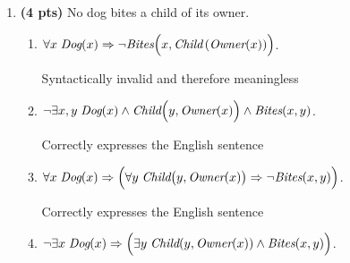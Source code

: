\documentclass{article}
\begin{document}
\begin{enumerate}
\begin{enumerate}[label=($\alph*$)]

    \addtocounter{enumii}{2} \item \textbf{(4 pts)} No dog bites a child of its owner.

        \begin{enumerate}[label=$\arabic*.$]


        \item $\forall x \; \mbox{\it Dog}(x) \Rightarrow \neg \mbox{\it Bites}\Bigl(x, \mbox{\it Child} \left(\mbox{\it Owner}(x) \right)\Bigr)$.

            \color{blue}
                Syntactically invalid and therefore meaningless
            \color{black}



        \item $\neg\exists x, y \; \mbox{\it Dog}(x) \wedge \mbox{\it Child}\Bigl(y, \mbox{\it Owner}(x)\Bigr) \wedge \mbox{\it Bites}(x, y)$.

            \color{blue}
                Correctly expresses the English sentence
            \color{black}



        \item $\forall x \; \mbox{\it Dog} (x) \Rightarrow \Bigl(\forall y\; \mbox{\it Child} \bigl(y, \mbox{\it Owner}(x)\bigr) \Rightarrow \neg \mbox{\it Bites} (x, y) \Bigr)$.

            \color{blue}
                Correctly expresses the English sentence
            \color{black}



        \item $\neg \exists x\; \mbox{\it Dog}(x) \Rightarrow \Bigl(\exists y\; \mbox{\it Child}(y, \mbox{\it Owner}(x)) \wedge \mbox{\it Bites}(x, y)\Bigr)$.


\end{enumerate}
\end{enumerate}
\end{enumerate}
\end{document}
